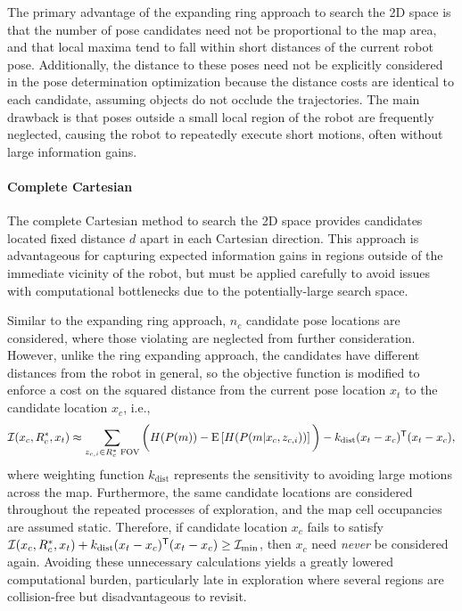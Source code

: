 The primary advantage of the expanding ring approach to search the 2D space is that the number of pose candidates need not be proportional to the map area, and that local maxima tend to fall within short distances of the current robot pose. Additionally, the distance to these poses need not be explicitly considered in the pose determination optimization because the distance costs are identical to each candidate, assuming objects do not occlude the trajectories. The main drawback is that poses outside a small local region of the robot are frequently neglected, causing the robot to repeatedly execute short motions, often without large information gains.

\paragraph{Complete Cartesian}
The complete Cartesian method to search the 2D space provides candidates located fixed distance $d$ apart in each Cartesian direction. This approach is advantageous for capturing expected information gains in regions outside of the immediate vicinity of the robot, but must be applied carefully to avoid issues with computational bottlenecks due to the potentially-large search space.

Similar to the expanding ring approach, $n_c$ candidate pose locations are considered, where those violating  are neglected from further consideration. However, unlike the ring expanding approach, the candidates have different distances from the robot in general, so the objective function is modified to enforce a cost on the squared distance from the current pose location $x_t$ to the candidate location $x_c$, i.e.,
\begin{align}
\label{eqn:ObjFunApproxCompleteCartesian}
\mathcal I(x_c,R_c^*,x_t)\approx \sum_{z_{c,i}\in R_{c}^*\text{ FOV}}\bigg(H(P(m))-\text{E}\left[H(P(m|x_c,z_{c,i}))\right]\bigg)-k_\text{dist}(x_t-x_c)^{\mathsf{T}}(x_t-x_c),
\end{align}
where weighting function $k_\text{dist}$ represents the sensitivity to avoiding large motions across the map. Furthermore, the same candidate locations are considered throughout the repeated processes of exploration, and the map cell occupancies are assumed static. Therefore, if candidate location $x_c$ fails to satisfy $\mathcal I(x_c,R_c^*,x_t)+k_\text{dist}(x_t-x_c)^{\mathsf{T}}(x_t-x_c)\geq\mathcal I_\text{min}$, then $x_c$ need \emph{never} be considered again. Avoiding these unnecessary calculations yields a greatly lowered computational burden, particularly late in exploration where several regions are collision-free but disadvantageous to revisit.


